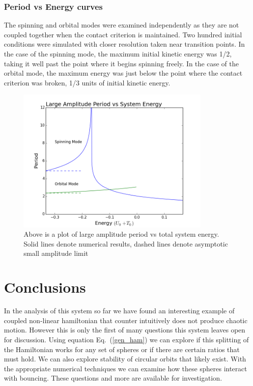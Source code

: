 \documentclass[prbg,preprint]{revtex4-1}
\begin{document}
\subsubsection{Period vs Energy curves}
The spinning and orbital modes were examined independently as they are not coupled together when the contact criterion is maintained. Two hundred initial conditions were simulated with closer resolution taken near transition points. In the case of the spinning mode, the maximum initial kinetic energy was 1/2, taking it well past the point where it begins spinning freely. In the case of the orbital mode, the maximum energy was just below the point where the contact criterion was broken, 1/3 units of initial kinetic energy.

\begin{figure}[h]
	\centering
	\includegraphics[width=0.85\textwidth]{./images/plot.png}
	\caption{Above is a plot of large amplitude period vs total system energy. Solid lines denote numerical results, dashed lines denote asymptotic small amplitude limit}
\end{figure}

\section{Conclusions}

In the analysis of this system so far we have found an interesting example of coupled non-linear hamiltonian that counter intuitively does not produce chaotic motion. However this is only the first of many questions this system leaves open for discussion. Using equation Eq.~(\ref{gen_ham}) we can explore if this splitting of the Hamiltonian works for any set of spheres or if there are certain ratios that must hold. We can also explore stability of circular orbits that likely exist. With the appropriate numerical techniques we can examine how these spheres interact with bouncing. These questions and more are available for investigation.
\end{document}
